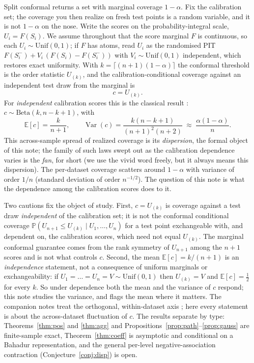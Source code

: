\documentclass[11pt]{article}
\begin{document}
Split conformal returns a set with marginal coverage $1-\alpha$. Fix the calibration set; the
coverage you then realize on fresh test points is a random variable, and it is not $1-\alpha$ on the
nose. Write the scores on the probability-integral scale, $U_i=F(S_i)$. We assume throughout that the
score marginal $F$ is continuous, so each $U_i\sim\mathrm{Unif}(0,1)$; if $F$ has atoms, read $U_i$ as
the randomised PIT $F(S_i^-)+V_i\,(F(S_i)-F(S_i^-))$ with $V_i\sim\mathrm{Unif}(0,1)$ independent,
which restores exact uniformity. With $k=\lceil(n+1)(1-\alpha)\rceil$ the conformal threshold is the
order statistic $U_{(k)}$, and the calibration-conditional coverage against an independent test draw
from the marginal is
\begin{equation}
c=U_{(k)} .
\end{equation}
For \emph{independent} calibration scores this is the classical result \citep{vovk2012,marques2024}:
$c\sim\mathrm{Beta}(k,n-k+1)$, with
\begin{equation}\label{eq:betavar}
\mathbb E[c]=\frac{k}{n+1},\qquad \operatorname{Var}(c)=\frac{k(n-k+1)}{(n+1)^2(n+2)}\;\approx\;
\frac{\alpha(1-\alpha)}{n}.
\end{equation}
This across-sample spread of realized coverage is its \emph{dispersion}, the formal object of this
note; the family of such laws swept out as the calibration dependence varies is the \emph{fan}, for
short (we use the vivid word freely, but it always means this dispersion). The per-dataset coverage
scatters around $1-\alpha$ with variance of order $1/n$ (standard deviation of order $n^{-1/2}$). The
question of this note is what the dependence among the calibration scores does to it.

Two cautions fix the object of study. First, $c=U_{(k)}$ is coverage against a test draw
\emph{independent} of the calibration set; it is not the conformal conditional coverage
$\mathbb P(U_{n+1}\le U_{(k)}\mid U_1,\dots,U_n)$ for a test point exchangeable with, and dependent
on, the calibration scores, which need not equal $U_{(k)}$. The marginal conformal guarantee comes
from the rank symmetry of $U_{n+1}$ among the $n+1$ scores and is not what controls $c$. Second, the
mean $\mathbb E[c]=k/(n+1)$ is an \emph{independence} statement, not a consequence of uniform
marginals or exchangeability: if $U_1=\dots=U_n=V\sim\mathrm{Unif}(0,1)$ then $U_{(k)}=V$ and
$\mathbb E[c]=\tfrac12$ for every $k$. So under dependence both the mean and the variance of $c$
respond; this note studies the variance, and flags the mean where it matters. The companion notes
treat the orthogonal, within-dataset axis \citep{cotton_marginally,cotton_signed}; here every
statement is about the across-dataset fluctuation of $c$. The results separate by type:
Theorems~\ref{thm:pos} and \ref{thm:agg} and Propositions~\ref{prop:path}--\ref{prop:gauss} are
finite-sample exact, Theorem~\ref{thm:coeff} is asymptotic and conditional on a Bahadur
representation, and the general per-level negative-association contraction (Conjecture~\ref{conj:disp})
is open.
\end{document}
